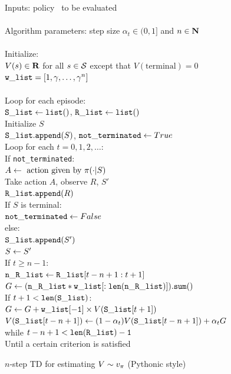 \begin{table}
\beginalg
Inputs: policy \pol\ to be evaluated\\
\\
Algorithm parameters: step size $\alpha_t \in (0, 1]$ and $n\in{\mbox{\bf N}}$\\
\\
Initialize:\\
\> $V(s)\in\mathbf{R}$ for all $s\in\mathcal{S}$ except that $V(\mathrm{terminal})=0$\\
\> ${\tt w\_list} = [1, \gamma, \ldots, \gamma^{n}]$\\
\\
Loop for each episode:\\
\> ${\tt S\_list} \leftarrow {\tt list()}$, ${\tt R\_list} \leftarrow {\tt list()}$\\
\> Initialize $S$\\
\> ${\tt S\_list.append}(S)$, ${\tt not\_terminated} \leftarrow True$\\
\> Loop for each $t=0,1,2,\ldots$:\\
\> \> If {\tt not\_terminated}:\\
\> \> \> $A \leftarrow \mbox{ action given by } \pi(\cdot|S)$\\
\> \> \> Take action $A$, observe $R$, $S'$\\
\> \> \> ${\tt R\_list.append}(R)$\\
\> \> \> If $S$ is terminal:\\
\> \> \> \> ${\tt not\_terminated} \leftarrow False$\\
\> \> \> else:\\
\> \> \> \> ${\tt S\_list.append}(S')$\\
\> \> \> \> $S \leftarrow S'$\\
\> \> If $t \geq n-1$:\\
\> \> \> ${\tt n\_R\_list} \leftarrow {\tt R\_list}[t-n+1:t+1]$\\
\> \> \> $G \leftarrow {\tt (n\_R\_list * w\_list[:len(n\_R\_list)]).sum()}$\\
\> \> \> If $t+1 < {\tt len(S\_list)}$:\\
\> \> \> \> $G \leftarrow G + {\tt w\_list[-1]} \times V({\tt S\_list}[t+1])$\\
\> \> \> $V({\tt S\_list}[t-n+1]) \leftarrow (1-\alpha_{t}) V({\tt S\_list}[t-n+1]) + \alpha_{t} G$\\
\> while $t-n+1 < {\tt len(R\_list)-1}$\\
Until a certain criterion is satisfied
\endalg
\caption{$n$-step TD for estimating $V\sim v_{\pi}$ (Pythonic style)}
\label{tab:alg:n-step-td-prediction-python-style}
\end{table}


